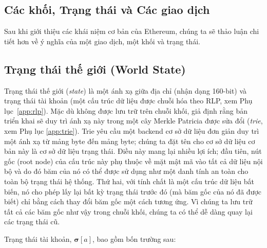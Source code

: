 \documentclass[9pt,oneside]{amsart}
\begin{document}
\begin{multicols}{2}
\section{Các khối, Trạng thái và Các giao dịch} \label{ch:bst}

Sau khi giới thiệu các khái niệm cơ bản của Ethereum, chúng ta sẽ thảo luận chi tiết hơn về ý nghĩa của một giao dịch, một khối và trạng thái.

\subsection{Trạng thái thế giới (World State)} \label{ch:state}

Trạng thái thế giới (\textit{state}) là một ánh xạ giữa địa chỉ (nhận dạng 160-bit) và trạng thái tài khoản (một cấu trúc dữ liệu được chuỗi hóa theo RLP, xem Phụ lục~\ref{app:rlp}). Mặc dù không được lưu trữ trên chuỗi khối, giả định rằng bản triển khai sẽ duy trì ánh xạ này trong một cây Merkle Patricia được sửa đổi (\textit{trie}, xem Phụ lục \ref{app:trie}). Trie yêu cầu một backend cơ sở dữ liệu đơn giản duy trì một ánh xạ từ mảng byte đến mảng byte; chúng ta đặt tên cho cơ sở dữ liệu cơ bản này là cơ sở dữ liệu trạng thái. Điều này mang lại nhiều lợi ích; đầu tiên, nút gốc (root node) của cấu trúc này phụ thuộc về mặt mật mã vào tất cả dữ liệu nội bộ và do đó băm của nó có thể được sử dụng như một danh tính an toàn cho toàn bộ trạng thái hệ thống. Thứ hai, với tính chất là một cấu trúc dữ liệu bất biến, nó cho phép lấy lại bất kỳ trạng thái trước đó (mà băm gốc của nó đã được biết) chỉ bằng cách thay đổi băm gốc một cách tương ứng. Vì chúng ta lưu trữ tất cả các băm gốc như vậy trong chuỗi khối, chúng ta có thể dễ dàng quay lại các trạng thái cũ.

Trạng thái tài khoản, $\boldsymbol{\sigma}[a]$, bao gồm bốn trường sau:


\end{multicols}
\end{document}
